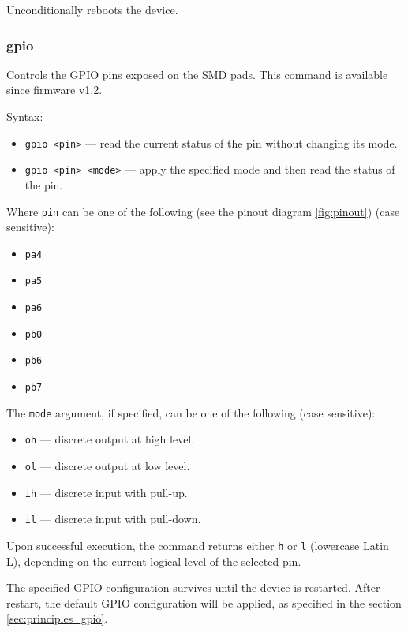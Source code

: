 \documentclass{zubaxdoc}
\begin{document}
Unconditionally reboots the device.

\subsubsection{gpio}\label{sec:cli_gpio}

Controls the GPIO pins exposed on the SMD pads.
This command is available since firmware v1.2.

Syntax:

\begin{itemize}
    \item \verb|gpio <pin>| --- read the current status of the pin without changing its mode.
    \item \verb|gpio <pin> <mode>| --- apply the specified mode and then read the status of the pin.
\end{itemize}

Where \verb|pin| can be one of the following (see the pinout diagram \ref{fig:pinout}) (case sensitive):

\begin{itemize}
    \item \verb|pa4|
    \item \verb|pa5|
    \item \verb|pa6|
    \item \verb|pb0|
    \item \verb|pb6|
    \item \verb|pb7|
\end{itemize}

The \verb|mode| argument, if specified, can be one of the following (case sensitive):

\begin{itemize}
    \item \verb|oh| --- discrete output at high level.
    \item \verb|ol| --- discrete output at low level.
    \item \verb|ih| --- discrete input with pull-up.
    \item \verb|il| --- discrete input with pull-down.
\end{itemize}

Upon successful execution, the command returns either \verb|h| or \verb|l| (lowercase Latin L),
depending on the current logical level of the selected pin.

The specified GPIO configuration survives until the device is restarted.
After restart, the default GPIO configuration will be applied, as specified in the section \ref{sec:principles_gpio}.
\end{document}
